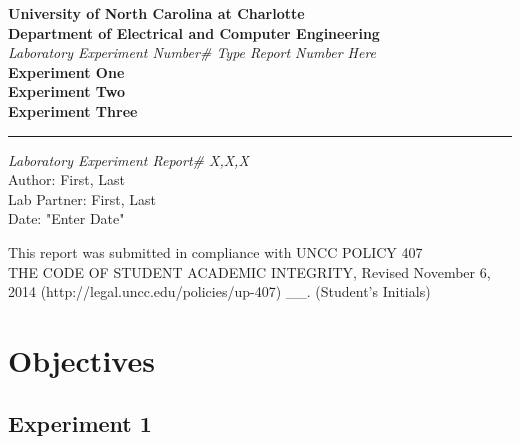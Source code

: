 \documentclass[a4paper]{article}
\begin{document}
\begin{titlepage}
\thispagestyle{fancy} %
\rhead{}
\chead{}
\rfoot{}
\cfoot{}
\lfoot{}
\renewcommand{\headrulewidth}{0pt} %
    \begin{center}
        \vspace*{1cm}
        
      
       \Large\textbf{University of North Carolina at Charlotte \\[1pt]
	Department of Electrical and Computer Engineering} \\[2pt]
\textit{Laboratory Experiment Number\# Type Report Number Here} \\[5pt]
\textbf{Experiment One \\[5pt]
Experiment Two\\[5pt]
Experiment Three\\
}

\noindent\rule{15cm}{0.4pt}
\vfill
        \vspace{0.5cm}
        \textit{Laboratory Experiment Report\# X,X,X} \\
		Author: First, Last\\
		Lab Partner: First, Last	\\
		Date: "Enter Date" \\
        
        \vspace{1.5cm}
        
        
        
        \vfill
		\vfill
        
       \large This report was submitted in compliance with UNCC POLICY 407\\
THE CODE OF STUDENT ACADEMIC INTEGRITY, Revised November 6, 2014
(http://legal.uncc.edu/policies/up-407) \_\_. (Student’s Initials) 
        \vspace{0.8cm}
        
    

    \end{center}
\end{titlepage}


\section{Objectives}

\subsection{Experiment 1}
\lipsum[1]
\end{document}
